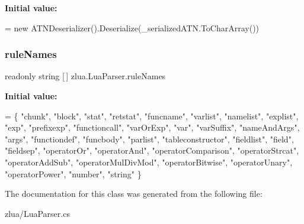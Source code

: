 {\bfseries Initial value\+:}
\begin{DoxyCode}
=
        \textcolor{keyword}{new} ATNDeserializer().Deserialize(\_serializedATN.ToCharArray())
\end{DoxyCode}
\mbox{\label{classzlua_1_1_lua_parser_aec8274ea089488563bab1965e6bd56f2}} 
\subsubsection{\texorpdfstring{rule\+Names}{ruleNames}}
{\footnotesize\ttfamily readonly string \mbox{[}$\,$\mbox{]} zlua.\+Lua\+Parser.\+rule\+Names\hspace{0.3cm}{\ttfamily [static]}}

{\bfseries Initial value\+:}
\begin{DoxyCode}
= \{
        \textcolor{stringliteral}{"chunk"}, \textcolor{stringliteral}{"block"}, \textcolor{stringliteral}{"stat"}, \textcolor{stringliteral}{"retstat"}, \textcolor{stringliteral}{"funcname"}, \textcolor{stringliteral}{"varlist"}, \textcolor{stringliteral}{"namelist"}, 
        \textcolor{stringliteral}{"explist"}, \textcolor{stringliteral}{"exp"}, \textcolor{stringliteral}{"prefixexp"}, \textcolor{stringliteral}{"functioncall"}, \textcolor{stringliteral}{"varOrExp"}, \textcolor{stringliteral}{"var"}, \textcolor{stringliteral}{"varSuffix"}, 
        \textcolor{stringliteral}{"nameAndArgs"}, \textcolor{stringliteral}{"args"}, \textcolor{stringliteral}{"functiondef"}, \textcolor{stringliteral}{"funcbody"}, \textcolor{stringliteral}{"parlist"}, \textcolor{stringliteral}{"tableconstructor"}, 
        \textcolor{stringliteral}{"fieldlist"}, \textcolor{stringliteral}{"field"}, \textcolor{stringliteral}{"fieldsep"}, \textcolor{stringliteral}{"operatorOr"}, \textcolor{stringliteral}{"operatorAnd"}, \textcolor{stringliteral}{"operatorComparison"}, 
        \textcolor{stringliteral}{"operatorStrcat"}, \textcolor{stringliteral}{"operatorAddSub"}, \textcolor{stringliteral}{"operatorMulDivMod"}, \textcolor{stringliteral}{"operatorBitwise"}, 
        \textcolor{stringliteral}{"operatorUnary"}, \textcolor{stringliteral}{"operatorPower"}, \textcolor{stringliteral}{"number"}, \textcolor{stringliteral}{"string"}
    \}
\end{DoxyCode}


The documentation for this class was generated from the following file\+:\begin{DoxyCompactItemize}
\item 
zlua/Lua\+Parser.\+cs\end{DoxyCompactItemize}
